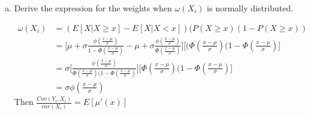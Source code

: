 \documentclass[11pt]{article}
\begin{document}
\begin{enumerate}[a)]
	\item Derive the expression for the weights when $\omega (X_i)$ is normally distributed.

	\begin{align*}
	\omega(X_i) &= ( E[X | X \geq x] - E[X | X < x] ) (P(X \geq x) ( 1 - P(X \geq x)) \\
	&=\bigg[ \mu + \sigma \frac{\phi (\frac{x - \mu}{\sigma})}{1 - \Phi( \frac{x - \mu}{\sigma})} - \mu + \sigma \frac{\phi (\frac{x - \mu}{\sigma})}{\Phi( \frac{x - \mu}{\sigma})} \bigg] \bigg[(\Phi( \frac{x - \mu}{\sigma})(1- \Phi( \frac{x - \mu}{\sigma}) \bigg] \\
	&=\sigma \bigg[\frac{ \phi( \frac{x - \mu}{\sigma}) }{\Phi( \frac{x - \mu}{\sigma})(1- \Phi( \frac{x - \mu}{\sigma})} \bigg] \bigg[\Phi( \frac{x - \mu}{\sigma})(1- \Phi( \frac{x - \mu}{\sigma})\bigg] \\
	&=\sigma \phi( \frac{x - \mu}{\sigma})
	\end{align*}
	\medskip
	Then $\frac{Cov(Y_i, X_i)}{var(X_i)} = E[\mu ' (x)]$

\end{enumerate}
\end{document}
